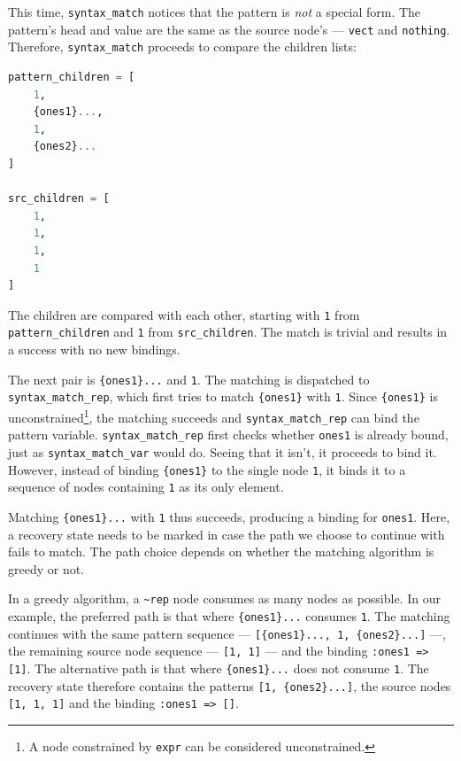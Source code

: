 \documentclass{juliacon}
\begin{document}
This time, \texttt{syntax\_match} notices that the pattern is \emph{not} a special
form. The pattern's head and value are the same as the source node's —
\texttt{vect} and \texttt{nothing}. Therefore, \texttt{syntax\_match} proceeds to compare
the children lists:

\begin{lstlisting}[language=julia]
pattern_children = [
    1,
    {ones1}...,
    1,
    {ones2}...
]

src_children = [
    1,
    1,
    1,
    1
]
\end{lstlisting}

The children are compared with each other, starting with \texttt{1} from
\texttt{pattern\_children} and \texttt{1} from \texttt{src\_children}. The match is trivial
and results in a success with no new bindings.

The next pair is \texttt{\{ones1\}...} and \texttt{1}. The matching is dispatched to
\texttt{syntax\_match\_rep}, which first tries to match \texttt{\{ones1\}} with
\texttt{1}. Since \texttt{\{ones1\}} is unconstrained\footnote{A node constrained by \texttt{expr} can be considered unconstrained.}, the matching succeeds
and \texttt{syntax\_match\_rep} can bind the pattern
variable. \texttt{syntax\_match\_rep} first checks whether \texttt{ones1} is already
bound, just as \texttt{syntax\_match\_var} would do. Seeing that it isn't, it
proceeds to bind it. However, instead of binding \texttt{\{ones1\}} to the
single node \texttt{1}, it binds it to a sequence of nodes containing \texttt{1} as
its only element.

Matching \texttt{\{ones1\}...} with \texttt{1} thus succeeds, producing a binding for
\texttt{ones1}. Here, a recovery state needs to be marked in case the path we
choose to continue with fails to match. The path choice depends on
whether the matching algorithm is greedy or not.

In a greedy algorithm, a \texttt{\textasciitilde{}rep} node consumes as many nodes as
possible. In our example, the preferred path is that where
\texttt{\{ones1\}...} consumes \texttt{1}. The matching continues with the same
pattern sequence — \texttt{[\{ones1\}..., 1, \{ones2\}...]} —, the remaining
source node sequence — \texttt{[1, 1]} — and the binding \texttt{:ones1 => [1]}. The
alternative path is that where \texttt{\{ones1\}...} does not consume \texttt{1}. The
recovery state therefore contains the patterns \texttt{[1, \{ones2\}...]}, the
source nodes \texttt{[1, 1, 1]} and the binding \texttt{:ones1 => []}.
\end{document}
